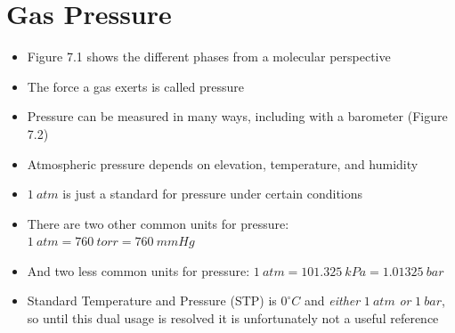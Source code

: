 \documentclass[12pt, openany, letterpaper]{memoir}
\begin{document}
\section{Gas Pressure}
\begin{itemize}
	\item Figure 7.1 shows the different phases from a molecular perspective
	\item The force a gas exerts is called pressure
	\item Pressure can be measured in many ways, including with a barometer (Figure 7.2)
	\item Atmospheric pressure depends on elevation, temperature, and humidity
	\item $1~atm$ is just a standard for pressure under certain conditions
	\item There are two other common units for pressure: $1~atm=760~torr=760~mmHg$
	\item And two less common units for pressure: $1~atm=101.325~kPa=1.01325~bar$
  \item Standard Temperature and Pressure (STP) is $0^{\circ}C$ and \emph{either} $1~atm$ \emph{or} $1~bar$, so until this dual usage is resolved it is unfortunately not a useful reference
\end{itemize}
\end{document}
